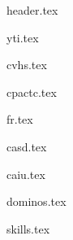 \documentclass[11pt]{article}
\begin{document}
{header.tex}


{yti.tex}

\spacing{}

{cvhs.tex}

\spacing{}

{cpactc.tex}

\spacing{}




{fr.tex}

\spacing{}

{casd.tex}

\spacing{}

{caiu.tex}

\spacing{}

{dominos.tex}

\spacing{}


{skills.tex}
\end{document}
